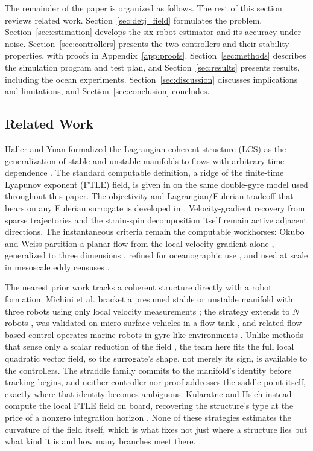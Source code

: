 \documentclass[lettersize,journal]{IEEEtran}
\begin{document}
The remainder of the paper is organized as follows. The rest of this
section reviews related work. Section~\ref{sec:detj_field} formulates
the problem. Section~\ref{sec:estimation} develops the six-robot
estimator and its accuracy under noise. Section~\ref{sec:controllers}
presents the two controllers and their stability properties, with
proofs in Appendix~\ref{app:proofs}. Section~\ref{sec:methods}
describes the simulation program and test plan, and
Section~\ref{sec:results} presents results, including the ocean
experiments. Section~\ref{sec:discussion} discusses implications and
limitations, and Section~\ref{sec:conclusion} concludes.

\subsection{Related Work}
\label{sec:related_robots}

Haller and Yuan formalized the Lagrangian coherent structure (LCS) as
the generalization of stable and unstable manifolds to flows with
arbitrary time dependence \cite{6}. The standard computable definition,
a ridge of the finite-time Lyapunov exponent (FTLE) field, is given in
\cite{8} on the same double-gyre model used throughout this paper. The
objectivity and Lagrangian/Eulerian tradeoff that bears on any Eulerian
surrogate is developed in \cite{16,17,18}. Velocity-gradient
recovery from sparse trajectories \cite{19} and the strain-spin
decomposition itself \cite{20} remain active adjacent directions. The
instantaneous criteria remain the computable workhorses: Okubo and Weiss
partition a planar flow from the local velocity gradient alone
\cite{21,22}, generalized to three dimensions \cite{23}, refined for
oceanographic use \cite{24}, and used at scale in mesoscale eddy censuses
\cite{5}.

The nearest prior work tracks a coherent structure directly with a
robot formation. Michini et al. bracket a presumed stable or unstable
manifold with three robots using only local velocity measurements
\cite{9}; the strategy extends to $N$ robots \cite{10}, was validated
on micro surface vehicles in a flow tank \cite{11}, and related
flow-based control operates marine robots in gyre-like environments
\cite{12}. Unlike methods that sense only a scalar reduction of the
field \cite{25}, the team here fits the full local quadratic vector
field, so the surrogate's shape, not merely its sign, is available to
the controllers. The straddle family commits to the manifold's identity
before tracking begins, and neither controller nor proof addresses the
saddle point itself, exactly where that identity becomes ambiguous.
Kularatne and Hsieh instead compute the local FTLE field on board,
recovering the structure's type at the price of a nonzero integration
horizon \cite{13}. None of these strategies estimates the curvature of
the field itself, which is what fixes not just where a structure lies
but what kind it is and how many branches meet there.
\end{document}
